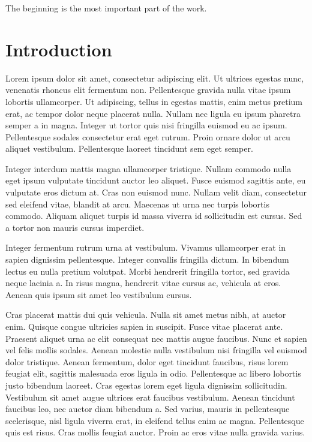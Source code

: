 
\begin{savequote}[50mm]
The beginning is the most important part of the work. 
\end{savequote}

\chapter{Introduction}
\label{cha:Introduction}

\ifpdf
    \graphicspath{{1_introduction/figures/PNG/}{1_introduction/figures/PDF/}{1_introduction/figures/}}
\else
    \graphicspath{{1_introduction/figures/EPS/}{1_introduction/figures/}}
\fi



\cite{turing1950computing}

Lorem ipsum dolor sit amet, consectetur adipiscing elit. Ut ultrices egestas nunc, venenatis rhoncus elit fermentum non. Pellentesque gravida nulla vitae ipsum lobortis ullamcorper. Ut adipiscing, tellus in egestas mattis, enim metus pretium erat, ac tempor dolor neque placerat nulla. Nullam nec ligula eu ipsum pharetra semper a in magna. Integer ut tortor quis nisi fringilla euismod eu ac ipsum. Pellentesque sodales consectetur erat eget rutrum. Proin ornare dolor ut arcu aliquet vestibulum. Pellentesque laoreet tincidunt sem eget semper.

Integer interdum mattis magna ullamcorper tristique. Nullam commodo nulla eget ipsum vulputate tincidunt auctor leo aliquet. Fusce euismod sagittis ante, eu vulputate eros dictum at. Cras non euismod nunc. Nullam velit diam, consectetur sed eleifend vitae, blandit at arcu. Maecenas ut urna nec turpis lobortis commodo. Aliquam aliquet turpis id massa viverra id sollicitudin est cursus. Sed a tortor non mauris cursus imperdiet.

Integer fermentum rutrum urna at vestibulum. Vivamus ullamcorper erat in sapien dignissim pellentesque. Integer convallis fringilla dictum. In bibendum lectus eu nulla pretium volutpat. Morbi hendrerit fringilla tortor, sed gravida neque lacinia a. In risus magna, hendrerit vitae cursus ac, vehicula at eros. Aenean quis ipsum sit amet leo vestibulum cursus.

Cras placerat mattis dui quis vehicula. Nulla sit amet metus nibh, at auctor enim. Quisque congue ultricies sapien in suscipit. Fusce vitae placerat ante. Praesent aliquet urna ac elit consequat nec mattis augue faucibus. Nunc et sapien vel felis mollis sodales. Aenean molestie nulla vestibulum nisi fringilla vel euismod dolor tristique. Aenean fermentum, dolor eget tincidunt faucibus, risus lorem feugiat elit, sagittis malesuada eros ligula in odio. Pellentesque ac libero lobortis justo bibendum laoreet. Cras egestas lorem eget ligula dignissim sollicitudin. Vestibulum sit amet augue ultrices erat faucibus vestibulum. Aenean tincidunt faucibus leo, nec auctor diam bibendum a. Sed varius, mauris in pellentesque scelerisque, nisl ligula viverra erat, in eleifend tellus enim ac magna. Pellentesque quis est risus. Cras mollis feugiat auctor. Proin ac eros vitae nulla gravida varius.

